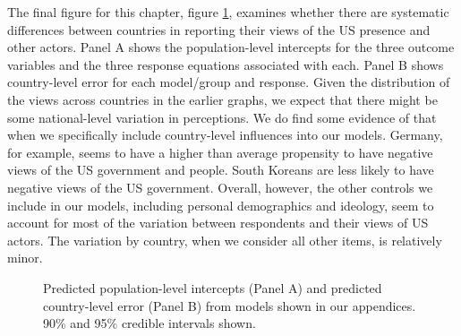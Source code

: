 The final figure for this chapter, figure \ref{fig:catbayesintercepts}, examines whether there are systematic differences between countries in reporting their views of the US presence and other actors. Panel A shows the population-level intercepts for the three outcome variables and the three response equations associated with each. Panel B shows country-level error for each model/group and response.  Given the distribution of the views across countries in the earlier graphs, we expect that there might be some national-level variation in perceptions. We do find some evidence of that when we specifically include country-level influences into our models. Germany, for example, seems to have a higher than average propensity to have negative views of the US government and people. South Koreans are less likely to have negative views of the US government. Overall, however, the other controls we include in our models, including personal demographics and ideology, seem to account for most of the variation between respondents and their views of US actors. The variation by country, when we consider all other items, is relatively minor. 



\begin{figure}[t]
	\centering{}
	\caption{Predicted population-level intercepts (Panel A) and predicted country-level error (Panel B) from models shown in our appendices. 90\% and 95\% credible intervals shown.}
	\label{fig:catbayesintercepts}
\end{figure}%
